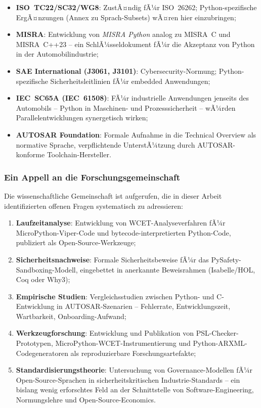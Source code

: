 ﻿\documentclass[12pt,a4paper,twoside]{article}
\begin{document}
\begin{itemize}
  \item \textbf{ISO~TC22/SC32/WG8}: ZustÃ¤ndig fÃ¼r ISO~26262;
        Python-spezifische ErgÃ¤nzungen (Annex zu Sprach-Subsets)
        wÃ¤ren hier einzubringen;
  \item \textbf{MISRA}: Entwicklung von \textit{MISRA Python} analog zu
        MISRA~C und MISRA~C++23 -- ein SchlÃ¼sseldokument fÃ¼r die
        Akzeptanz von Python in der Automobilindustrie;
  \item \textbf{SAE International (J3061, J3101)}: Cybersecurity-Normung;
        Python-spezifische Sicherheitsleitlinien fÃ¼r embedded Anwendungen;
  \item \textbf{IEC~SC65A (IEC~61508)}: FÃ¼r industrielle Anwendungen
        jenseits des Automobils -- Python in Maschinen- und Prozesssicherheit --
        wÃ¼rden Parallelentwicklungen synergetisch wirken;
  \item \textbf{AUTOSAR Foundation}: Formale Aufnahme in die
        Technical Overview als normative Sprache, verpflichtende
        UnterstÃ¼tzung durch AUTOSAR-konforme Toolchain-Hersteller.
\end{itemize}

\subsubsection{Ein Appell an die Forschungsgemeinschaft}

Die wissenschaftliche Gemeinschaft ist aufgerufen, die in dieser Arbeit
identifizierten offenen Fragen systematisch zu adressieren:

\begin{enumerate}
  \item \textbf{Laufzeitanalyse}: Entwicklung von WCET-Analyseverfahren
        fÃ¼r MicroPython-Viper-Code und bytecode-interpretierten Python-Code,
        publiziert als Open-Source-Werkzeuge;
  \item \textbf{Sicherheitsnachweise}: Formale Sicherheitsbeweise fÃ¼r
        das PySafety-Sandboxing-Modell, eingebettet in anerkannte
        Beweisrahmen (Isabelle/HOL, Coq oder Why3);
  \item \textbf{Empirische Studien}: Vergleichsstudien zwischen Python-
        und C-Entwicklung in AUTOSAR-Szenarien -- Fehlerrate, Entwicklungszeit,
        Wartbarkeit, Onboarding-Aufwand;
  \item \textbf{Werkzeugforschung}: Entwicklung und Publikation von
        PSL-Checker-Prototypen, MicroPython-WCET-Instrumentierung und
        Python-ARXML-Codegeneratoren als reproduzierbare
        Forschungsartefakte;
  \item \textbf{Standardisierungstheorie}: Untersuchung von Governance-Modellen
        fÃ¼r Open-Source-Sprachen in sicherheitskritischen Industrie-Standards --
        ein bislang wenig erforschtes Feld an der Schnittstelle von
        Software-Engineering, Normungslehre und Open-Source-Economics.
\end{enumerate}
\end{document}
